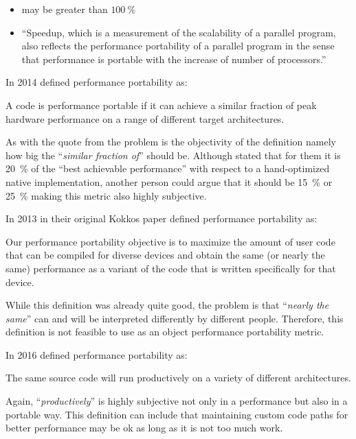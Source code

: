 \begin{itemize}
    \item may be greater than $\SI{100}{\percent}$
    \item \enquote{Speedup, which is a measurement of the scalability of a parallel program, also reflects the performance portability of a parallel program in the sense that performance is portable with the increase of number of processors.}
\end{itemize}

\newpage
In 2014 \citeauthor{kunkel_performance_2014} defined performance portability as:
\begin{quotebox}{\citet{kunkel_performance_2014}}
    A code is performance portable if it can achieve a similar fraction of peak hardware performance on a range of different target architectures.
\end{quotebox}
As with the quote from \citeauthor{edwards_kokkos_2013} the problem is the objectivity of the definition namely how big the \enquote{\textit{similar fraction of}} should be. 
Although \citeauthor{kunkel_performance_2014} stated that for them it is \SI{20}{\percent} of the \enquote{best achievable performance} with respect to a hand-optimized native implementation, another person could argue that it should be \SI{15}{\percent} or \SI{25}{\percent} making this metric also highly subjective. 


\newpage
In 2013 in their original Kokkos paper \citeauthor{edwards_kokkos_2013} defined performance portability as:
\begin{quotebox}{\citet{edwards_kokkos_2013}}
    Our performance portability objective is to maximize the amount of user code that can be compiled for diverse devices and obtain the same (or nearly the same) performance as a variant of the code that is written specifically for that device.
\end{quotebox}
While this definition was already quite good, the problem is that \enquote{\textit{nearly the same}} can and will be interpreted differently by different people. 
Therefore, this definition is not feasible to use as an object performance portability metric.


\newpage 
In 2016 \citet{larkin_performance_2016} defined performance portability as:
\begin{quotebox}{\citet{larkin_performance_2016}}
    The same source code will run productively on a variety of different architectures.
\end{quotebox}
Again, \enquote{\textit{productively}} is highly subjective not only in a performance but also in a portable way. 
This definition can include that maintaining custom code paths for better performance may be ok as long as it is not too much work. 


